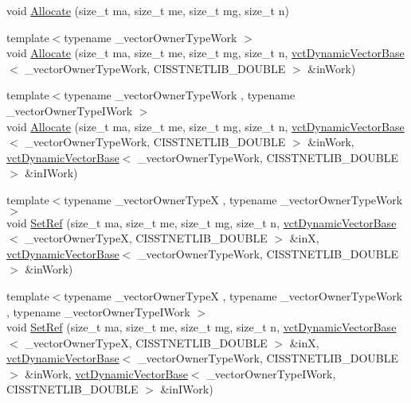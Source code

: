 \begin{DoxyCompactItemize}
void \hyperlink{classnmr_l_sq_lin_solution_dynamic_a01e2930c59e67d741632c4afe8aad8af}{Allocate} (size\-\_\-t ma, size\-\_\-t me, size\-\_\-t mg, size\-\_\-t n)
\item 
{\footnotesize template$<$typename \-\_\-vector\-Owner\-Type\-Work $>$ }\\void \hyperlink{classnmr_l_sq_lin_solution_dynamic_a243ceddab54cdeae4eadbd7238127cd5}{Allocate} (size\-\_\-t ma, size\-\_\-t me, size\-\_\-t mg, size\-\_\-t n, \hyperlink{classvct_dynamic_vector_base}{vct\-Dynamic\-Vector\-Base}$<$ \-\_\-vector\-Owner\-Type\-Work, C\-I\-S\-S\-T\-N\-E\-T\-L\-I\-B\-\_\-\-D\-O\-U\-B\-L\-E $>$ \&in\-Work)
\item 
{\footnotesize template$<$typename \-\_\-vector\-Owner\-Type\-Work , typename \-\_\-vector\-Owner\-Type\-I\-Work $>$ }\\void \hyperlink{classnmr_l_sq_lin_solution_dynamic_af1a4a85bb16b379b2f5326e624d5007f}{Allocate} (size\-\_\-t ma, size\-\_\-t me, size\-\_\-t mg, size\-\_\-t n, \hyperlink{classvct_dynamic_vector_base}{vct\-Dynamic\-Vector\-Base}$<$ \-\_\-vector\-Owner\-Type\-Work, C\-I\-S\-S\-T\-N\-E\-T\-L\-I\-B\-\_\-\-D\-O\-U\-B\-L\-E $>$ \&in\-Work, \hyperlink{classvct_dynamic_vector_base}{vct\-Dynamic\-Vector\-Base}$<$ \-\_\-vector\-Owner\-Type\-Work, C\-I\-S\-S\-T\-N\-E\-T\-L\-I\-B\-\_\-\-D\-O\-U\-B\-L\-E $>$ \&in\-I\-Work)
\item 
{\footnotesize template$<$typename \-\_\-vector\-Owner\-Type\-X , typename \-\_\-vector\-Owner\-Type\-Work $>$ }\\void \hyperlink{classnmr_l_sq_lin_solution_dynamic_a625e489b29e3af0ccbba728c90a224cd}{Set\-Ref} (size\-\_\-t ma, size\-\_\-t me, size\-\_\-t mg, size\-\_\-t n, \hyperlink{classvct_dynamic_vector_base}{vct\-Dynamic\-Vector\-Base}$<$ \-\_\-vector\-Owner\-Type\-X, C\-I\-S\-S\-T\-N\-E\-T\-L\-I\-B\-\_\-\-D\-O\-U\-B\-L\-E $>$ \&in\-X, \hyperlink{classvct_dynamic_vector_base}{vct\-Dynamic\-Vector\-Base}$<$ \-\_\-vector\-Owner\-Type\-Work, C\-I\-S\-S\-T\-N\-E\-T\-L\-I\-B\-\_\-\-D\-O\-U\-B\-L\-E $>$ \&in\-Work)
\item 
{\footnotesize template$<$typename \-\_\-vector\-Owner\-Type\-X , typename \-\_\-vector\-Owner\-Type\-Work , typename \-\_\-vector\-Owner\-Type\-I\-Work $>$ }\\void \hyperlink{classnmr_l_sq_lin_solution_dynamic_aa37b80c3b5d6c56cc4246df74336d81c}{Set\-Ref} (size\-\_\-t ma, size\-\_\-t me, size\-\_\-t mg, size\-\_\-t n, \hyperlink{classvct_dynamic_vector_base}{vct\-Dynamic\-Vector\-Base}$<$ \-\_\-vector\-Owner\-Type\-X, C\-I\-S\-S\-T\-N\-E\-T\-L\-I\-B\-\_\-\-D\-O\-U\-B\-L\-E $>$ \&in\-X, \hyperlink{classvct_dynamic_vector_base}{vct\-Dynamic\-Vector\-Base}$<$ \-\_\-vector\-Owner\-Type\-Work, C\-I\-S\-S\-T\-N\-E\-T\-L\-I\-B\-\_\-\-D\-O\-U\-B\-L\-E $>$ \&in\-Work, \hyperlink{classvct_dynamic_vector_base}{vct\-Dynamic\-Vector\-Base}$<$ \-\_\-vector\-Owner\-Type\-I\-Work, C\-I\-S\-S\-T\-N\-E\-T\-L\-I\-B\-\_\-\-D\-O\-U\-B\-L\-E $>$ \&in\-I\-Work)

\end{DoxyCompactItemize}
